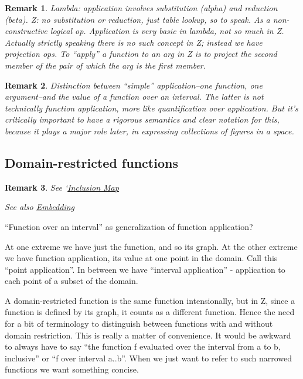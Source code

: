 \documentclass[12pt]{tufte-handout}
\numberwithin{equation}{subsection}
\numberwithin{equation}{subsection}
\newtheorem{remark}{Remark}
\begin{document}
  \begin{remark}
    Lambda: application involves substitution (alpha) and reduction
    (beta).  Z: no substitution or reduction, just table lookup, so to
    speak.  As a non-constructive logical op.  Application is very
    basic in lambda, not so much in Z.  Actually strictly speaking
    there is no such concept in Z; instead we have projection ops.  To
    ``apply'' a function to an arg in Z is to project the second
    member of the pair of which the arg is the first member.
  \end{remark}

  \begin{remark}
    Distinction between ``simple'' application--one function, one
    argument--and the value of a function over an interval.  The
    latter is not technically function application, more like
    quantification over application.  But it's critically important to
    have a rigorous semantics and clear notation for this, because it
    plays a major role later, in expressing collections of figures in
    a space.
  \end{remark}

  \subsection{Domain-restricted functions}
  \label{subs:domrestrfunc}

  \begin{remark}
    See `\href{http://en.wikipedia.org/wiki/Inclusion\_map}{Inclusion Map}

    See also \href{http://en.wikipedia.org/wiki/Embedding}{Embedding}
  \end{remark}

  ``Function over an interval'' as generalization of function application?

  At one extreme we have just the function, and so its graph.  At the
  other extreme we have function application, its value at one point
  in the domain.  Call this ``point application''.  In between we have
  ``interval application'' - application to each point of a subset of
  the domain.

  A domain-restricted function is the same function intensionally, but
  in Z, since a function is defined by its graph, it counts as a
  different function.  Hence the need for a bit of terminology to
  distinguish between functions with and without domain restriction.
  This is really a matter of convenience.  It would be awkward to
  always have to say ``the function f evaluated over the interval from
  a to b, inclusive'' or ``f over interval a..b''.  When we just want
  to refer to such narrowed functions we want something concise.
\end{document}
